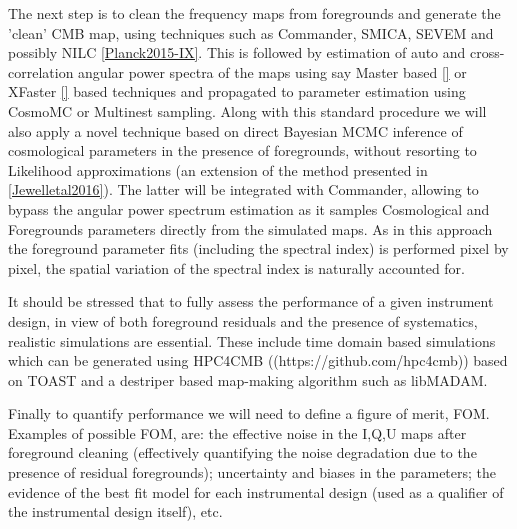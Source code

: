 The next step is to clean the frequency maps from foregrounds and generate the 'clean' CMB map, using techniques such as Commander, SMICA, SEVEM and possibly NILC \ref{Planck2015-IX}. This is followed by estimation of auto and cross-correlation angular power spectra of the maps using say Master based \ref{}  or XFaster \ref{} based techniques and propagated to parameter estimation using CosmoMC or Multinest sampling.
Along with this standard procedure we will also apply a novel technique based on direct Bayesian MCMC inference of cosmological parameters in the presence of foregrounds, without resorting to Likelihood approximations (an extension of the method presented in  \ref{Jewelletal2016}). 
The latter will be integrated with Commander, allowing to bypass the angular power spectrum estimation as it samples Cosmological and Foregrounds parameters directly from the simulated maps. As in this approach the foreground parameter fits (including the spectral index) is performed pixel by pixel, the spatial variation of the spectral index is naturally accounted for. 


It should be stressed that to fully assess the performance of a given instrument design, in view of both foreground residuals and the presence of systematics, realistic simulations are essential. These include time domain based simulations which can be generated using HPC4CMB ((https://github.com/hpc4cmb)) based on TOAST 
and a destriper based map-making algorithm such as libMADAM. 


Finally to quantify performance we will need to define a figure of merit, FOM. Examples of possible FOM, are: the effective noise in the I,Q,U maps after foreground cleaning (effectively quantifying the noise degradation due to the presence of residual foregrounds); uncertainty and biases in the parameters; the evidence of the best fit model for each instrumental design (used as a qualifier of the instrumental design itself), etc.


 



%






